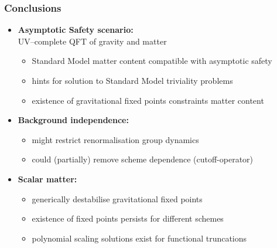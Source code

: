 \documentclass[]{beamer}  %
\begin{document}


\begin{frame}
  \frametitle{Conclusions}

  \begin{itemize}
    \fontsize{10pt}{7.2}\selectfont
    \item \textbf{Asymptotic Safety scenario:}\\
      UV--complete QFT of gravity and matter
      \fontsize{8pt}{7.2}\selectfont
      \begin{itemize}
        \item Standard Model matter content compatible with asymptotic safety
        \item hints for solution to Standard Model triviality problems
        \item existence of gravitational fixed points constraints matter content
      \end{itemize}
      \vfill

    \fontsize{10pt}{7.2}\selectfont
    \item \textbf{Background independence:}
      \fontsize{8pt}{7.2}\selectfont
      \begin{itemize}
        \item might restrict renormalisation group dynamics
        \item could (partially) remove scheme dependence (cutoff-operator)
      \end{itemize}
      \vfill

    \fontsize{10pt}{7.2}\selectfont
    \item \textbf{Scalar matter:}
      \fontsize{8pt}{7.2}\selectfont
      \begin{itemize}
        \item generically destabilise gravitational fixed points
        \item existence of fixed points persists for different schemes
        \item polynomial scaling solutions exist for functional truncations
      \end{itemize}
  \end{itemize}
\end{frame}


\begin{frame}
  \titlepage
\end{frame}
\end{document}
